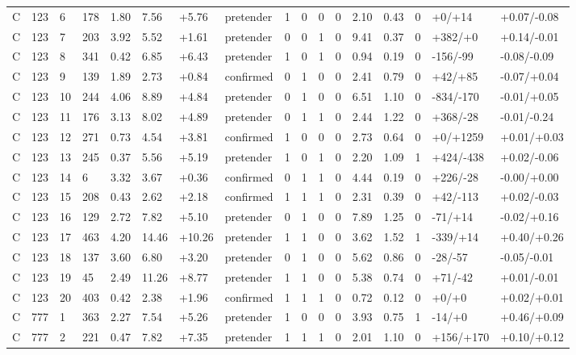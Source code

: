 \documentclass[11pt,a4paper]{article}
\begin{document}
{\begin{longtable}[]{@{}lllllllllllllllll@{}}
C & 123 & 6 & 178 & 1.80 & 7.56 & +5.76 & pretender & 1 & 0 & 0 & 0 & 2.10 & 0.43 & 0 & +0/+14 & +0.07/-0.08 \\
C & 123 & 7 & 203 & 3.92 & 5.52 & +1.61 & pretender & 0 & 0 & 1 & 0 & 9.41 & 0.37 & 0 & +382/+0 & +0.14/-0.01 \\
C & 123 & 8 & 341 & 0.42 & 6.85 & +6.43 & pretender & 1 & 0 & 1 & 0 & 0.94 & 0.19 & 0 & -156/-99 & -0.08/-0.09 \\
C & 123 & 9 & 139 & 1.89 & 2.73 & +0.84 & confirmed & 0 & 1 & 0 & 0 & 2.41 & 0.79 & 0 & +42/+85 & -0.07/+0.04 \\
C & 123 & 10 & 244 & 4.06 & 8.89 & +4.84 & pretender & 0 & 1 & 0 & 0 & 6.51 & 1.10 & 0 & -834/-170 & -0.01/+0.05 \\
C & 123 & 11 & 176 & 3.13 & 8.02 & +4.89 & pretender & 0 & 1 & 1 & 0 & 2.44 & 1.22 & 0 & +368/-28 & -0.01/-0.24 \\
C & 123 & 12 & 271 & 0.73 & 4.54 & +3.81 & confirmed & 1 & 0 & 0 & 0 & 2.73 & 0.64 & 0 & +0/+1259 & +0.01/+0.03 \\
C & 123 & 13 & 245 & 0.37 & 5.56 & +5.19 & pretender & 1 & 0 & 1 & 0 & 2.20 & 1.09 & 1 & +424/-438 & +0.02/-0.06 \\
C & 123 & 14 & 6 & 3.32 & 3.67 & +0.36 & confirmed & 0 & 1 & 1 & 0 & 4.44 & 0.19 & 0 & +226/-28 & -0.00/+0.00 \\
C & 123 & 15 & 208 & 0.43 & 2.62 & +2.18 & confirmed & 1 & 1 & 1 & 0 & 2.31 & 0.39 & 0 & +42/-113 & +0.02/-0.03 \\
C & 123 & 16 & 129 & 2.72 & 7.82 & +5.10 & pretender & 0 & 1 & 0 & 0 & 7.89 & 1.25 & 0 & -71/+14 & -0.02/+0.16 \\
C & 123 & 17 & 463 & 4.20 & 14.46 & +10.26 & pretender & 1 & 1 & 0 & 0 & 3.62 & 1.52 & 1 & -339/+14 & +0.40/+0.26 \\
C & 123 & 18 & 137 & 3.60 & 6.80 & +3.20 & pretender & 0 & 1 & 0 & 0 & 5.62 & 0.86 & 0 & -28/-57 & -0.05/-0.01 \\
C & 123 & 19 & 45 & 2.49 & 11.26 & +8.77 & pretender & 1 & 1 & 0 & 0 & 5.38 & 0.74 & 0 & +71/-42 & +0.01/-0.01 \\
C & 123 & 20 & 403 & 0.42 & 2.38 & +1.96 & confirmed & 1 & 1 & 1 & 0 & 0.72 & 0.12 & 0 & +0/+0 & +0.02/+0.01 \\
C & 777 & 1 & 363 & 2.27 & 7.54 & +5.26 & pretender & 1 & 0 & 0 & 0 & 3.93 & 0.75 & 1 & -14/+0 & +0.46/+0.09 \\
C & 777 & 2 & 221 & 0.47 & 7.82 & +7.35 & pretender & 1 & 1 & 1 & 0 & 2.01 & 1.10 & 0 & +156/+170 & +0.10/+0.12 \\

\end{longtable}}
\end{document}
